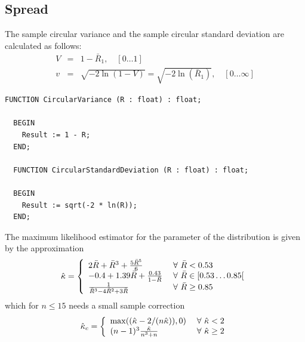 \begin{refsection}
\subsection{Spread}

The sample circular variance  and the sample circular standard deviation   are calculated as follows:
\begin{eqnarray}
  V      &=& 1 - \bar{R}_1, \quad [0\ldots 1] \\
  v      &=& \sqrt{-2\ln(1-V)} = \sqrt{-2\ln(\bar{R}_1)}, \quad [0\ldots \infty]
\end{eqnarray}

\begin{lstlisting}[caption=Circular variance and standard deviation]
  FUNCTION CircularVariance (R : float) : float;

  BEGIN
    Result := 1 - R;
  END;

  FUNCTION CircularStandardDeviation (R : float) : float;

  BEGIN
    Result := sqrt(-2 * ln(R));
  END;
\end{lstlisting}

The maximum likelihood estimator for the parameter \skalar{\kappa} of the  distribution is given by the approximation
\begin{equation}
  \hat{\kappa} = \left\{
          \begin{array}{l@{\;}l}
             2 \bar{R} + \bar{R}^3 + \frac{5 \bar{R}^5}{6}  & \quad \forall\ \bar{R} < 0.53 \\
             -0.4 + 1.39 \bar{R} + \frac{0.43}{1-\bar{R}}   & \quad \forall\ \bar{R} \in [0.53\ldots 0.85[\\
             \frac{1}{\bar{R}^3 - 4 \bar{R}^2 + 3 \bar{R}}  & \quad \forall\ \bar{R} \geq 0.85
          \end{array}
        \right.
\end{equation}
which for \( n \leq 15 \) needs a small sample correction
\begin{equation}
  \hat{\kappa}_c = \left\{
          \begin{array}{l@{\;}l}
             \max((\hat{\kappa} - 2/(n\hat{\kappa})), 0) & \quad \forall\ \hat{\kappa} < 2 \\
             (n-1)^3 \frac{\hat{\kappa}}{n^3 + n}        & \quad \forall\ \hat{\kappa} \geq 2
          \end{array}
        \right.
\end{equation}


\end{refsection}
